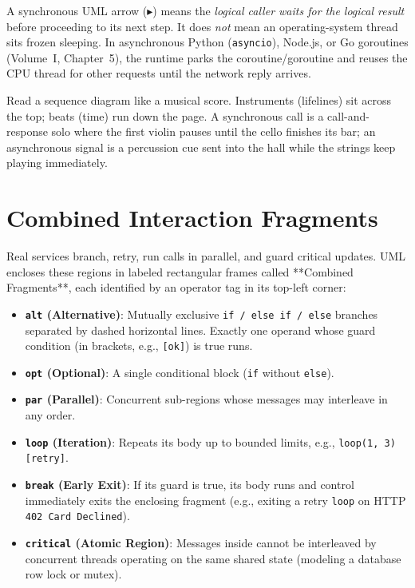 \begin{commonmistakebox}
A synchronous UML arrow ($\blacktriangleright$) means the \emph{logical caller waits for the logical result} before proceeding to its next step. It does \emph{not} mean an operating-system thread sits frozen sleeping. In asynchronous Python (\texttt{asyncio}), Node.js, or Go goroutines (Volume~I, Chapter~5), the runtime parks the coroutine/goroutine and reuses the CPU thread for other requests until the network reply arrives.
\end{commonmistakebox}

\begin{intuitionbox}
Read a sequence diagram like a musical score. Instruments (lifelines) sit across the top; beats (time) run down the page. A synchronous call is a call-and-response solo where the first violin pauses until the cello finishes its bar; an asynchronous signal is a percussion cue sent into the hall while the strings keep playing immediately.
\end{intuitionbox}

\section{Combined Interaction Fragments}

Real services branch, retry, run calls in parallel, and guard critical updates. UML encloses these regions in labeled rectangular frames called **Combined Fragments**, each identified by an operator tag in its top-left corner:

\begin{itemize}[leftmargin=18pt]
  \item \textbf{\texttt{alt} (Alternative)}: Mutually exclusive \texttt{if / else if / else} branches separated by dashed horizontal lines. Exactly one operand whose guard condition (in brackets, e.g., \texttt{[ok]}) is true runs.
  \item \textbf{\texttt{opt} (Optional)}: A single conditional block (\texttt{if} without \texttt{else}).
  \item \textbf{\texttt{par} (Parallel)}: Concurrent sub-regions whose messages may interleave in any order.
  \item \textbf{\texttt{loop} (Iteration)}: Repeats its body up to bounded limits, e.g., \texttt{loop(1, 3) [retry]}.
  \item \textbf{\texttt{break} (Early Exit)}: If its guard is true, its body runs and control immediately exits the enclosing fragment (e.g., exiting a retry \texttt{loop} on HTTP \texttt{402 Card Declined}).
  \item \textbf{\texttt{critical} (Atomic Region)}: Messages inside cannot be interleaved by concurrent threads operating on the same shared state (modeling a database row lock or mutex).
\end{itemize}

